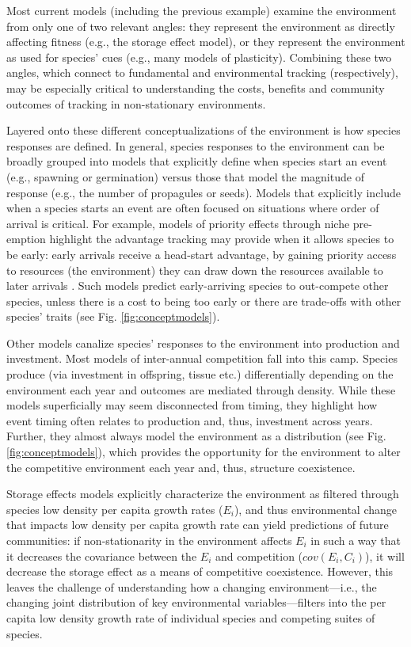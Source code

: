 \documentclass[11pt,letterpaper]{article}
\begin{document}
Most current models (including the previous example) examine the environment from only one of two relevant angles: they represent the environment as directly affecting fitness (e.g., the storage effect model), or they represent the environment as used for species' cues (e.g., many models of plasticity). Combining these two angles, which connect to fundamental and environmental tracking (respectively), may be especially critical to understanding the costs, benefits and community outcomes of tracking in non-stationary environments. 

Layered onto these different conceptualizations of the environment is how species responses are defined. In general, species responses to the environment can be broadly grouped into models that explicitly define when species start an event (e.g., spawning or germination) versus those that model the magnitude of response (e.g., the number of propagules or seeds). Models that explicitly include when a species starts an event are often focused on situations where order of arrival is critical. For example, models of priority effects through niche pre-emption highlight the advantage tracking may provide when it allows species to be early: early arrivals receive a head-start advantage, by gaining priority access to resources (the environment) they can draw down the resources available to later arrivals \citep{fukami2015}. Such models predict early-arriving species to out-compete other species, unless there is a cost to being too early or there are trade-offs with other species' traits (see Fig. \ref{fig:conceptmodels}).

Other models canalize species' responses to the environment into production and investment. Most models of inter-annual competition \citep[most explicit examples of `modern coexistence theory,' e.g.,][]{Chesson:2004eo,Angert:2009} fall into this camp. Species produce (via investment in offspring, tissue etc.) differentially depending on the environment each year and outcomes are mediated through density. While these models superficially may seem disconnected from timing, they highlight how event timing often relates to production and, thus, investment across years. Further, they almost always model the environment as a distribution (see Fig. \ref{fig:conceptmodels}), which provides the opportunity for the environment to alter the competitive environment each year and, thus, structure coexistence. 

 Storage effects models explicitly characterize the environment as filtered through species low density per capita growth rates ($E_i$), and thus environmental change that impacts low density per capita growth rate can yield predictions of future communities: if non-stationarity in the environment affects $E_i$ in such a way that it decreases the covariance between the $E_i$ and competition ($cov(E_i, C_i)$), it will decrease the storage effect as a means of competitive coexistence.  However, this leaves the challenge of understanding how a changing environment---i.e., the changing joint distribution of key environmental variables---filters into the per capita low density growth rate of individual species and competing suites of species.
\end{document}
